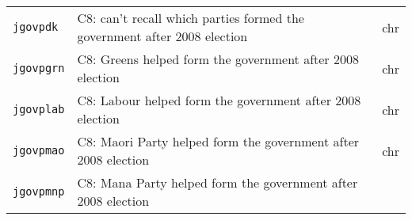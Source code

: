 \documentclass[]{article}
\begin{document}
\begin{longtable}[]{@{}lll@{}}
\begin{minipage}[t]{0.14\columnwidth}
\texttt{jgovpdk}\strut
\end{minipage} & \begin{minipage}[t]{0.70\columnwidth}\raggedright\strut
C8: can't recall which parties formed the government after 2008
election\strut
\end{minipage} & \begin{minipage}[t]{0.08\columnwidth}\raggedright\strut
chr\strut
\end{minipage}\tabularnewline
\begin{minipage}[t]{0.14\columnwidth}\raggedright\strut
\texttt{jgovpgrn}\strut
\end{minipage} & \begin{minipage}[t]{0.70\columnwidth}\raggedright\strut
C8: Greens helped form the government after 2008 election\strut
\end{minipage} & \begin{minipage}[t]{0.08\columnwidth}\raggedright\strut
chr\strut
\end{minipage}\tabularnewline
\begin{minipage}[t]{0.14\columnwidth}\raggedright\strut
\texttt{jgovplab}\strut
\end{minipage} & \begin{minipage}[t]{0.70\columnwidth}\raggedright\strut
C8: Labour helped form the government after 2008 election\strut
\end{minipage} & \begin{minipage}[t]{0.08\columnwidth}\raggedright\strut
chr\strut
\end{minipage}\tabularnewline
\begin{minipage}[t]{0.14\columnwidth}\raggedright\strut
\texttt{jgovpmao}\strut
\end{minipage} & \begin{minipage}[t]{0.70\columnwidth}\raggedright\strut
C8: Maori Party helped form the government after 2008 election\strut
\end{minipage} & \begin{minipage}[t]{0.08\columnwidth}\raggedright\strut
chr\strut
\end{minipage}\tabularnewline
\begin{minipage}[t]{0.14\columnwidth}\raggedright\strut
\texttt{jgovpmnp}\strut
\end{minipage} & \begin{minipage}[t]{0.70\columnwidth}\raggedright\strut
C8: Mana Party helped form the government after 2008 election\strut
\end{minipage} & \begin{minipage}[t]{0.08\columnwidth}\raggedright\strut

\end{minipage}
\end{longtable}
\end{document}
